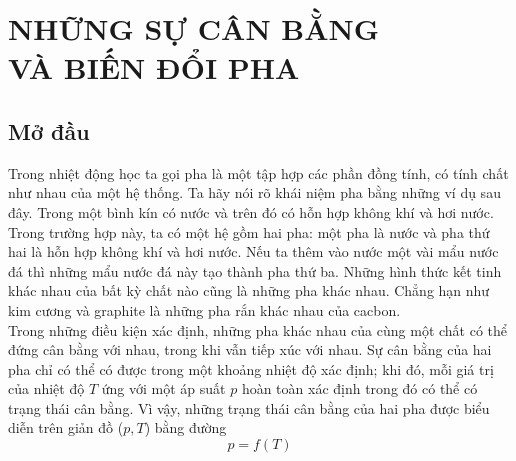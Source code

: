 
\chapter[NHỮNG SỰ CÂN BẰNG VÀ BIẾN ĐỔI PHA]{NHỮNG SỰ CÂN BẰNG\\ VÀ BIẾN ĐỔI PHA}\label{chap:15}

\section{Mở đầu}\label{sec:15_1}
Trong nhiệt động học ta gọi pha là một tập hợp các phần đồng tính, có tính chất như nhau của một hệ thống. Ta hãy nói rõ khái niệm pha bằng những ví dụ sau đây. Trong một bình kín có nước và trên đó có hỗn hợp không khí và hơi nước. Trong trường hợp này, ta có một hệ gồm hai pha: một pha là nước và pha thứ hai là hỗn hợp không khí và hơi nước. Nếu ta thêm vào nước một vài mẩu nước đá thì những mẩu nước đá này tạo thành pha thứ ba. Những hình thức kết tinh khác nhau của bất kỳ chất nào cũng là những pha khác nhau. Chẳng hạn như kim cương và graphite là những pha rắn khác nhau của cacbon.\\

Trong những điều kiện xác định, những pha khác nhau của cùng một chất có thể đứng cân bằng với nhau, trong khi vẫn tiếp xúc với nhau. Sự cân bằng của hai pha chỉ có thể có được trong một khoảng nhiệt độ xác định; khi đó, mỗi giá trị của nhiệt độ $T$ ứng với một áp suất $p$ hoàn toàn xác định trong đó có thể có trạng thái cân bằng. Vì vậy, những trạng thái cân bằng của hai pha được biểu diễn trên giản đồ ($p,T$) bằng đường
\begin{equation}\label{eq:15_1}
    p = f(T)
\end{equation}

